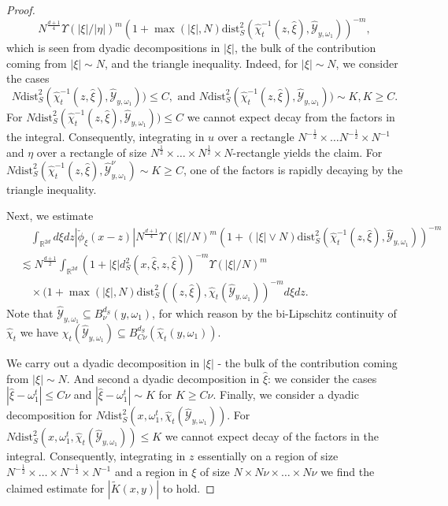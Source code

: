 \documentclass{amsart}
\numberwithin{equation}{section}
\theoremstyle{definition}
\newcommand{\R}{\mathbb{R}}
\begin{document}
\begin{proof}
\begin{equation*}
    N^{\frac{d+1}{4}} \Upsilon(|\xi|/|\eta|)^m (1+\max(|\xi|,N) \text{dist}_S^2(\hat{\chi}_t^{-1}(z,\hat{\xi}), \hat{\mathcal{Y}}_{y,\omega_1}))^{-m},
\end{equation*}
which is seen from dyadic decompositions in $|\xi|$, the bulk of the contribution coming from $|\xi| \sim N$, and the triangle inequality. Indeed, for $|\xi| \sim N$, we consider the cases
\begin{equation*}
    N \text{dist}_S^2(\hat{\chi}_t^{-1}(z,\hat{\xi}), \hat{\mathcal{Y}}_{y,\omega_1})) \leq C, \text{ and } N \text{dist}_S^2(\hat{\chi}_t^{-1}(z,\hat{\xi}), \hat{\mathcal{Y}}_{y,\omega_1})) \sim K, K \geq C.
\end{equation*}
For $N \text{dist}_S^2(\hat{\chi}_t^{-1}(z,\hat{\xi}), \hat{\mathcal{Y}}_{y,\omega_1})) \leq C$ we cannot expect decay from the factors in the integral. Consequently, integrating in $u$ over a rectangle $N^{-\frac{1}{2}} \times \ldots N^{-\frac{1}{2}} \times N^{-1}$ and $\eta$ over a rectangle of size $N^{\frac{1}{2}} \times \ldots \times N^{\frac{1}{2}} \times N$-rectangle yields the claim.
For $N \text{dist}_S^2 (\hat{\chi}_t^{-1}(z,\hat{\xi}), \hat{\mathcal{Y}}^{\nu}_{y,\omega_1}) \sim K \geq C$, one of the factors is rapidly decaying by the triangle inequality.

Next, we estimate
\begin{equation*}
\begin{split}
    &\quad \int_{\R^{2d}} d\xi dz |\check{\phi}_{\xi}(x-z)| N^{\frac{d+1}{4}} \Upsilon(|\xi|/N)^m (1+ (|\xi| \vee N) \text{dist}_S^2(\hat{\chi}_t^{-1}(z,\hat{\xi}),\hat{\mathcal{Y}}_{y,\omega_1}))^{-m} \\
    &\lesssim N^{\frac{d+1}{2}} \int_{\R^{2d}} (1+|\xi| d_S^2(x,\hat{\xi},z,\hat{\xi}))^{-m} \Upsilon(|\xi|/N)^m \\
    &\quad \times (1+ \max(|\xi|,N) \text{dist}_S^2((z,\hat{\xi}),\hat{\chi}_t(\hat{\mathcal{Y}}_{y,\omega_1}))^{-m} d\xi dz.
\end{split}
\end{equation*}
Note that $\hat{\mathcal{Y}}_{y,\omega_1} \subseteq B_{\nu}^{d_S}(y,\omega_1)$, for which reason by the bi-Lipschitz continuity of $\hat{\chi}_t$ we have $\hat{\chi}_t(\hat{\mathcal{Y}}_{y,\omega_1}) \subseteq B_{C \nu}^{d_S}(\hat{\chi}_t(y,\omega_1))$. %

We carry out a dyadic decomposition in $|\xi|$ - the bulk of the contribution coming from $|\xi| \sim N$. And second a dyadic decomposition in $\hat{\xi}$: we consider the cases $|\hat{\xi} - \omega_1^t| \leq C \nu$ and $|\hat{\xi} - \omega_1^t| \sim K$ for $K \geq C \nu$. Finally, we consider a dyadic decomposition for $N \text{dist}_S^2(x,\omega_1^t,\hat{\chi}_t(\hat{\mathcal{Y}}_{y,\omega_1}))$. For $N \text{dist}_S^2(x,\omega_1^t,\hat{\chi}_t(\hat{\mathcal{Y}}_{y,\omega_1})) \leq K$ we cannot expect decay of the factors in the integral. Consequently, integrating in $z$ essentially on a region of size $N^{-\frac{1}{2}} \times \ldots \times N^{-\frac{1}{2}} \times N^{-1}$ and a region in $\xi$ of size $N \times N \nu \times \ldots \times N \nu$ we find the claimed estimate for $|\tilde{K}(x,y)|$ to hold.


\end{proof}
\end{document}
